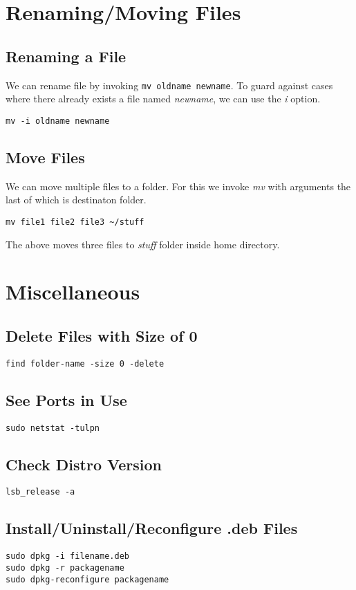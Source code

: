 \documentclass[a4paper, 12pt]{article}
\begin{document}
\section{Renaming/Moving Files}
\subsection{Renaming a File}
We can rename file by invoking \verb|mv oldname newname|.
To guard against cases where there already exists a file named \emph{newname}, we can use the \emph{i} option.
\begin{verbatim}
mv -i oldname newname
\end{verbatim}
\subsection{Move Files}
We can move multiple files to a folder. For this we invoke \emph{mv} with arguments the last of which is destinaton folder.
\begin{verbatim}
mv file1 file2 file3 ~/stuff
\end{verbatim}
The above moves three files to \emph{stuff} folder inside home directory.

\section{Miscellaneous}
\subsection{Delete Files with Size of 0}
\verb|find folder-name -size 0 -delete|
\subsection{See Ports in Use}
\verb|sudo netstat -tulpn|
\subsection{Check Distro Version}
\verb|lsb_release -a|
\subsection{Install/Uninstall/Reconfigure .deb Files}
\begin{verbatim}
sudo dpkg -i filename.deb
sudo dpkg -r packagename
sudo dpkg-reconfigure packagename
\end{verbatim}
\end{document}
